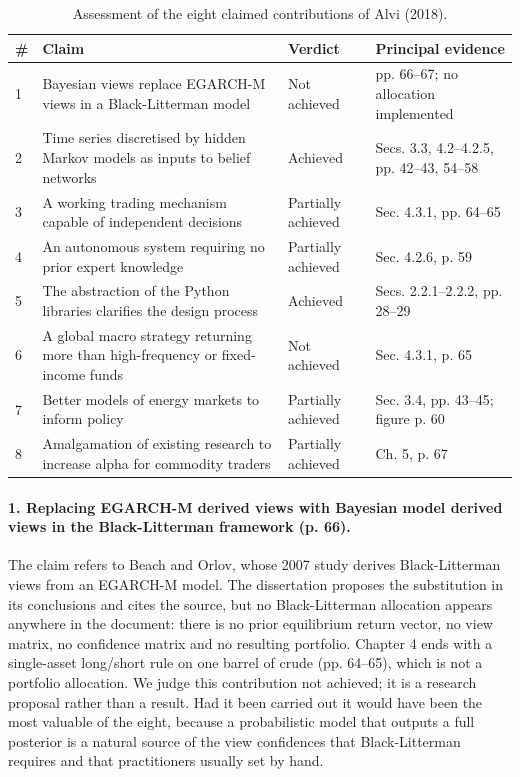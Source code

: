 \documentclass[11pt,a4paper]{article}
\begin{document}
\begin{table}[H]
\centering
\caption{Assessment of the eight claimed contributions of Alvi (2018).}
\label{tab:contrib}
\renewcommand{\arraystretch}{1.25}
\begin{tabular}{@{}p{0.5cm}p{7.4cm}p{2.6cm}p{4.2cm}@{}}
\toprule
\textbf{\#} & \textbf{Claim} & \textbf{Verdict} & \textbf{Principal evidence} \\
\midrule
1 & Bayesian views replace EGARCH-M views in a Black-Litterman model & Not achieved &
pp. 66--67; no allocation implemented \\
2 & Time series discretised by hidden Markov models as inputs to belief networks & Achieved &
Secs. 3.3, 4.2--4.2.5, pp. 42--43, 54--58 \\
3 & A working trading mechanism capable of independent decisions & Partially achieved &
Sec. 4.3.1, pp. 64--65 \\
4 & An autonomous system requiring no prior expert knowledge & Partially achieved &
Sec. 4.2.6, p. 59 \\
5 & The abstraction of the Python libraries clarifies the design process & Achieved &
Secs. 2.2.1--2.2.2, pp. 28--29 \\
6 & A global macro strategy returning more than high-frequency or fixed-income funds & Not achieved
& Sec. 4.3.1, p. 65 \\
7 & Better models of energy markets to inform policy & Partially achieved &
Sec. 3.4, pp. 43--45; figure p. 60 \\
8 & Amalgamation of existing research to increase alpha for commodity traders & Partially achieved
& Ch. 5, p. 67 \\
\bottomrule
\end{tabular}
\end{table}

\paragraph{1. Replacing EGARCH-M derived views with Bayesian model derived views in the
Black-Litterman framework (p. 66).} The claim refers to Beach and Orlov, whose 2007 study derives
Black-Litterman views from an EGARCH-M model. The dissertation proposes the substitution in its
conclusions and cites the source, but no Black-Litterman allocation appears anywhere in the
document: there is no prior equilibrium return vector, no view matrix, no confidence matrix and no
resulting portfolio. Chapter 4 ends with a single-asset long/short rule on one barrel of crude
(pp. 64--65), which is not a portfolio allocation. We judge this contribution not achieved; it is
a research proposal rather than a result. Had it been carried out it would have been the most
valuable of the eight, because a probabilistic model that outputs a full posterior is a natural
source of the view confidences that Black-Litterman requires and that practitioners usually set by
hand.
\end{document}
